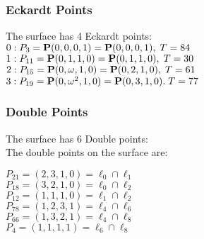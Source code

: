 \documentclass{article}
\newcommand{\bP}{{\bf P}}
\begin{document}
{\subsubsection*{Eckardt Points}
The surface has 4 Eckardt points:\\
$0 : P_{3}=\bP(0, 0, 0, 1) = \bP(0, 0, 0, 1),\; T= 84$\\
$1 : P_{11}=\bP(0, 1, 1, 0) = \bP(0, 1, 1, 0),\; T= 30$\\
$2 : P_{15}=\bP(0, \omega , 1, 0) = \bP(0, 2, 1, 0),\; T= 61$\\
$3 : P_{19}=\bP(0, \omega^{2}, 1, 0) = \bP(0, 3, 1, 0).\; T= 77$\\
\subsubsection*{Double Points}
The surface has 6 Double points:\\
The double points on the surface are:\\
\begin{multicols}{2}
\noindent
$P_{21} = ( 2, 3, 1, 0 ) = \ell_{0} \cap \ell_{1} $\\
$P_{18} = ( 3, 2, 1, 0 ) = \ell_{0} \cap \ell_{2} $\\
$P_{12} = ( 1, 1, 1, 0 ) = \ell_{1} \cap \ell_{2} $\\
$P_{78} = ( 1, 2, 3, 1 ) = \ell_{4} \cap \ell_{6} $\\
$P_{66} = ( 1, 3, 2, 1 ) = \ell_{4} \cap \ell_{8} $\\
$P_{4} = ( 1, 1, 1, 1 ) = \ell_{6} \cap \ell_{8} $\\
\end{multicols}
}
\end{document}
